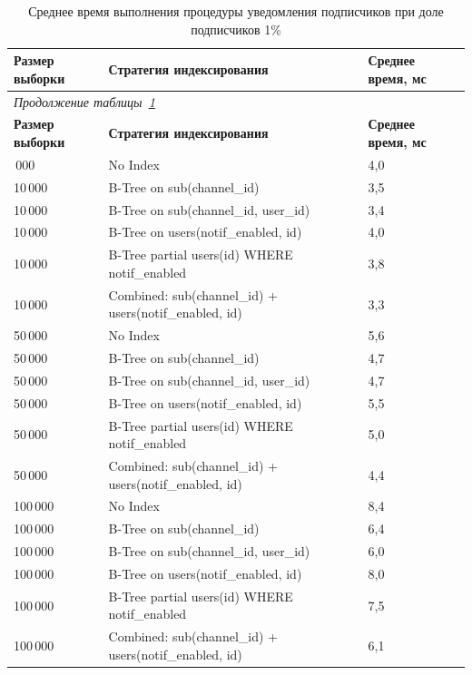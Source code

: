 \begin{longtable}{|p{2.4cm}|p{9.9cm}|p{2.3cm}|}
    \caption{Среднее время выполнения процедуры уведомления подписчиков при доле подписчиков 1\%}\label{tab:benchmark_avg_0_01} \\
    \hline
    \textbf{Размер выборки} & \textbf{Стратегия индексирования} & \textbf{Среднее время, мс} \\
    \hline
    \endfirsthead
    \multicolumn{3}{l}{\textit{Продолжение таблицы~\ref{tab:benchmark_avg_0_01}}} \\
    \hline
    \textbf{Размер выборки} & \textbf{Стратегия индексирования} & \textbf{Среднее время, мс} \\
    \hline
    \endhead
    \endfoot
    \endlastfoot
    10\,000 & No Index & 4,0 \\
    \hline
    10\,000 & B-Tree on sub(channel\_id) & 3,5 \\
    \hline
    10\,000 & B-Tree on sub(channel\_id, user\_id) & 3,4 \\
    \hline
    10\,000 & B-Tree on users(notif\_enabled, id) & 4,0 \\
    \hline
    10\,000 & B-Tree partial users(id) WHERE notif\_enabled & 3,8 \\
    \hline
    10\,000 & Combined: sub(channel\_id) + users(notif\_enabled, id) & 3,3 \\
    \hline
    50\,000 & No Index & 5,6 \\
    \hline
    50\,000 & B-Tree on sub(channel\_id) & 4,7 \\
    \hline
    50\,000 & B-Tree on sub(channel\_id, user\_id) & 4,7 \\
    \hline
    50\,000 & B-Tree on users(notif\_enabled, id) & 5,5 \\
    \hline
    50\,000 & B-Tree partial users(id) WHERE notif\_enabled & 5,0 \\
    \hline
    50\,000 & Combined: sub(channel\_id) + users(notif\_enabled, id) & 4,4 \\
    \hline
    100\,000 & No Index & 8,4 \\
    \hline
    100\,000 & B-Tree on sub(channel\_id) & 6,4 \\
    \hline
    100\,000 & B-Tree on sub(channel\_id, user\_id) & 6,0 \\
    \hline
    100\,000 & B-Tree on users(notif\_enabled, id) & 8,0 \\
    \hline
    100\,000 & B-Tree partial users(id) WHERE notif\_enabled & 7,5 \\
    \hline
    100\,000 & Combined: sub(channel\_id) + users(notif\_enabled, id) & 6,1 \\

\end{longtable}
